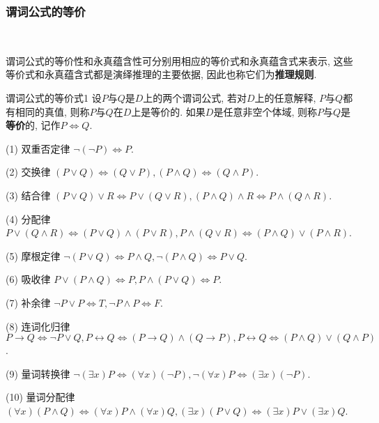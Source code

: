 \subsubsection{谓词公式的等价}~{}

谓词公式的等价性和永真蕴含性可分别用相应的等价式和永真蕴含式来表示, 这些等价式和永真蕴含式都是演绎推理的主要依据, 因此也称它们为\textbf{推理规则}.

\begin{mydef}{谓词公式的等价式}{1}
设$P$与$Q$是$D$上的两个谓词公式, 若对$D$上的任意解释, $P$与$Q$都有相同的真值, 则称$P$与$Q$在$D$上是等价的. 如果$D$是任意非空个体域, 则称$P$与$Q$是\textbf{等价}的, 记作$P\Leftrightarrow Q$.
\end{mydef}

(1) 双重否定律      $\neg(\neg P) \Leftrightarrow P$.

(2) 交换律               $(P\vee Q) \Leftrightarrow  (Q\vee P),  ( P\wedge Q) \Leftrightarrow  ( Q\wedge P)$.

(3) 结合律               $(P\vee Q)\vee R \Leftrightarrow  P\vee (Q\vee R),
               (P\wedge Q)\wedge R \Leftrightarrow  P\wedge (Q\wedge R)$.

(4) 分配律               $P\vee (Q\wedge R) \Leftrightarrow  (P\vee Q)\wedge (P\vee R),
               P\wedge (Q\vee R) \Leftrightarrow  (P\wedge Q)\vee (P\wedge R)$.

(5) 摩根定律        $\neg  (P\vee Q) \Leftrightarrow  P\wedge Q,
              \neg  (P\wedge Q) \Leftrightarrow P\vee Q$.

(6) 吸收律              $ P\vee (P\wedge Q) \Leftrightarrow P,
                P\wedge (P\vee Q) \Leftrightarrow P$.

(7) 补余律               $\neg P\vee P \Leftrightarrow  T, \neg  P\wedge P \Leftrightarrow  F$.

(8) 连词化归律      $ P\rightarrow Q \Leftrightarrow  \neg P\vee Q,
               P\longleftrightarrow Q \Leftrightarrow  (P\rightarrow Q)\wedge (Q\rightarrow P),
               P\longleftrightarrow Q \Leftrightarrow  (P\wedge Q)\vee (Q\wedge P)$.

(9) 量词转换律     $ \neg  (\exists x)P \Leftrightarrow  (\forall x)( \neg  P),
              \neg  (\forall x)P \Leftrightarrow  (\exists x) (\neg  P)$.

(10) 量词分配律    $(\forall x) (P\wedge Q) \Leftrightarrow  (\forall x)P\wedge (\forall x)Q, (\exists x) (P\vee Q) \Leftrightarrow  (\exists x)P\vee (\exists x)Q$.

